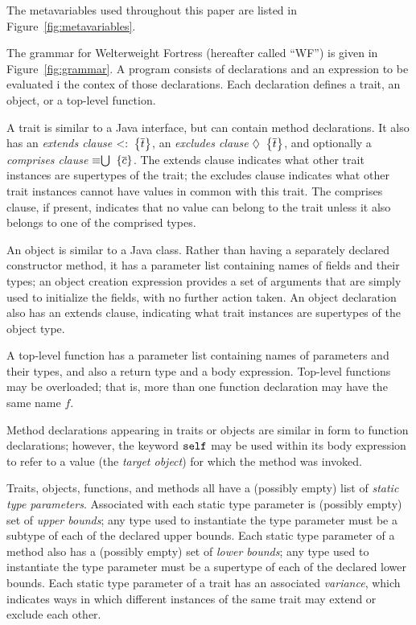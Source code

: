 




The metavariables used throughout this paper are listed in Figure~\ref{fig:metavariables}.

The grammar for Welterweight Fortress (hereafter called ``WF'') is given in Figure~\ref{fig:grammar}.
A program consists of declarations and an expression to be evaluated i the contex of those declarations.
Each declaration defines a trait, an object, or a top-level function.

A trait is similar to a Java interface, but can contain method declarations.
It also has an \emph{extends clause} \hbox{$<:\;\big\{\overline{t}\big\}$}, an \emph{excludes clause} \hbox{$\mathrel{\lozenge}\;\big\{\overline{t}\big\}$},
and optionally a \emph{comprises clause} \hbox{$\mathrel{\mathord{\equiv}\mathord{\bigcup}}\;\{\overline{c}\}$}.  The extends clause indicates what other trait instances are supertypes
of the trait; the excludes clause indicates what other trait instances cannot have values in common with this trait.
The comprises clause, if present, indicates that no value can belong to the trait unless it also belongs
to one of the comprised types.

An object is similar to a Java class.  Rather than having a separately declared constructor method,
it has a parameter list containing names of fields and their types; an object creation expression
provides a set of arguments that are simply used to initialize the fields, with no further action taken.
An object declaration also has an extends clause, indicating what trait instances are supertypes of the object type.

A top-level function has a parameter list containing names of parameters and their types, and also a return type and a body expression.
Top-level functions may be overloaded; that is, more than one function declaration may have the same name $f$.

Method declarations appearing in traits or objects are similar in form to function declarations; however, the keyword $\mathtt{self}$
may be used within its body expression to refer to a value (the \emph{target object}) for which the method was invoked.



Traits, objects, functions, and methods all have a (possibly empty) list of \emph{static type parameters}.
Associated with each static type parameter is (possibly empty) set of \emph{upper bounds}; any type used to instantiate the
type parameter must be a subtype of each of the declared upper bounds.
Each static type parameter of a method also has a (possibly empty) set of \emph{lower bounds}; any type used to instantiate the
type parameter must be a supertype of each of the declared lower bounds.
Each static type parameter of a trait has an associated \emph{variance}, which indicates ways in which different
instances of the same trait may extend or exclude each other.

